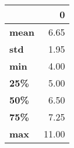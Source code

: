 \begin{tabular}{lr}
\toprule
{} &      0 \\
\midrule
\textbf{mean} &   6.65 \\
\textbf{std } &   1.95 \\
\textbf{min } &   4.00 \\
\textbf{25\% } &   5.00 \\
\textbf{50\% } &   6.50 \\
\textbf{75\% } &   7.25 \\
\textbf{max } &  11.00 \\
\bottomrule
\end{tabular}
